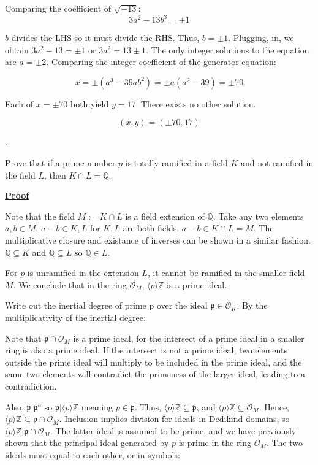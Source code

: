 \documentclass{article}
\def\ZZ{{\mathbb{Z}}}
\newcounter{problemcnt}
\newcommand{\Problem}{{
    \vspace{5mm}
    \stepcounter{problemcnt}
    \noindent
    \arabic{problemcnt}. 
}
}
\newcommand{\Proof}{{
    \vspace{2mm}
    \noindent
    \textbf{
    \underline{Proof}}
}
}
\newcommand{\<}{{{
    \langle
}}}
\def\>{{{
    \rangle
}}}
\def\ZZ{{\mathbb{Z}}}
\newcommand{\ringInt}{
    {\mathcal{O}}
}
\newcommand{\pideal}{
    {{\mathfrak{p}}}
}
\def\QQ{\mathbb{Q}}
\begin{document}
Comparing the coefficient of $\sqrt{-13}$:
\[
    3a^2-13b^3 = \pm 1
\]

$b$ divides the LHS so it must divide the RHS. Thus, $b = \pm 1$. 
Plugging, in, we obtain $3a^2-13 = \pm1$ or $3a^2 = 13\pm1$. The only 
integer solutions to the equation are $a = \pm2$. Comparing the integer 
coefficient of the generator equation:

\[
    x = \pm (a^3-39ab^2) = \pm a (a^2-39) = \pm 70
\]

Each of $x =\pm70$ both yield $y = 17$. There exists no other solution. 

\[
\boxed{(x, y) = (\pm70, 17)}
\]

\Problem
Prove that if a prime number $p$ is totally ramified in a field 
$K$ and not ramified in the field $L$, then $K \cap L = \QQ$. 

\Proof 
Note that the field $M := K \cap L$ is a field extension of $\QQ$. 
Take any two elements $a, b \in M$. $a - b \in K, L$ for $K, L$ are 
both fields. $a-b \in K \cap L = M$. The multiplicative closure 
and existance of inverses
can be shown in a similar fashion. $\QQ \subseteq K$ and 
$\QQ \subseteq L$ so $\QQ \in L$. 

For $p$ is unramified in the extension $L$, it cannot be 
ramified in the smaller field $M$. We conclude that in the 
ring $\ringInt_M$, $\<p\>\ZZ$ is a prime ideal. 

Write out the inertial degree of prime p
over the ideal $\pideal \in \ringInt_K$. By the multiplicativity 
of the inertial degree: 


Note that $\pideal \cap \ringInt_M$ is a prime ideal, for 
the intersect of a prime ideal in a smaller ring is also 
a prime ideal. If the intersect is not a prime ideal, 
two elements outside the prime ideal will multiply to 
be included in the prime ideal, and the same two elements 
will contradict the primeness of the larger ideal, leading 
to a contradiction. 

Also, $\pideal|\pideal^n$ so $\pideal|\<p\>\ZZ$ meaning $p \in \pideal$. 
Thus, $\<p\>\ZZ \subseteq \pideal$, and $\<p\>\ZZ \subseteq \ringInt_M$. Hence, 
$\<p\>\ZZ \subseteq \pideal \cap \ringInt_M$. Inclusion implies division 
for ideals in Dedikind domains, so $\<p\>\ZZ|\pideal \cap \ringInt_M$. 
The latter ideal is assumed to be prime, and we have previously shown 
that the principal ideal generated by $p$ is prime in the ring $\ringInt_M$. 
The two ideals must equal to each other, or in symbols:
\end{document}
